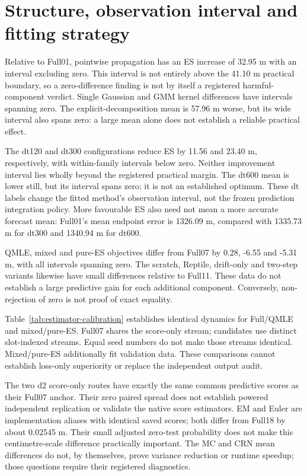 \FloatBarrier
\endgroup

\section{Structure, observation interval and fitting strategy}
\label{sec:method-findings}\hypertarget{sec:method-findings}{}
Relative to Full01, pointwise propagation has an ES increase of 32.95 m
with an interval excluding zero. This interval is not entirely above the
41.10 m practical boundary, so a zero-difference finding is not by itself
a registered harmful-component verdict. Single Gaussian and GMM kernel
differences have intervals spanning zero. The explicit-decomposition mean
is 57.96 m worse, but its wide interval also spans zero: a large mean alone
does not establish a reliable practical effect.

The dt120 and dt300 configurations reduce ES by 11.56 and 23.40 m,
respectively, with within-family intervals below zero. Neither improvement
interval lies wholly beyond the registered practical margin. The dt600 mean
is lower still, but its interval spans zero; it is not an established optimum.
These dt labels change the fitted method's observation interval, not the
frozen prediction integration policy. More favourable ES also need not mean
a more accurate forecast mean: Full01's mean endpoint error is 1326.09 m,
compared with 1335.73 m for dt300 and 1340.94 m for dt600.

QMLE, mixed and pure-ES objectives differ from Full07 by 0.28, -6.55 and
-5.31 m, with all intervals spanning zero. The scratch, Reptile, drift-only
and two-step variants likewise have small differences relative to Full11.
These data do not establish a large predictive gain for each additional
component. Conversely, non-rejection of zero is not proof of exact equality.

\begin{samepage}
Table~\ref{tab:estimator-calibration} establishes identical dynamics for
Full/QMLE and mixed/pure-ES. Full07 shares the score-only stream; candidates
use distinct slot-indexed streams. Equal seed numbers do not make those
streams identical. Mixed/pure-ES additionally fit validation data.
These comparisons cannot establish loss-only superiority or replace
the independent output audit.
\end{samepage}

The two d2 score-only routes have exactly the same common predictive scores
as their Full07 anchor. Their zero paired spread does not establish powered
independent replication or validate the native score estimators.
EM and Euler are implementation aliases with identical saved scores; both
differ from Full18 by about 0.02545 m. Their small adjusted zero-test probability
does not make this centimetre-scale difference practically important.
The MC and CRN mean differences do not, by themselves, prove variance reduction
or runtime speedup; those questions require their registered diagnostics.


